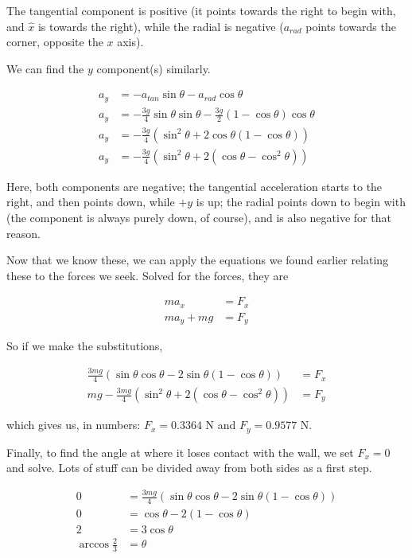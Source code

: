 \documentclass[8.01x]{subfiles}
\begin{document}
The tangential component is positive (it points towards the right to begin with, and $\hat{x}$ is towards the right), while the radial is negative ($a_{rad}$ points towards the corner, opposite the $x$ axis).

We can find the $y$ component(s) similarly.

\begin{align}
a_y &= -a_{tan} \sin \theta - a_{rad} \cos \theta\\
a_y &= -\frac{3 g}{4} \sin \theta \sin \theta - \frac{3 g}{2} (1 - \cos \theta) \cos \theta\\
a_y &= -\frac{3 g}{4} \left(\sin^2 \theta + 2\cos \theta (1 - \cos \theta)\right)\\
a_y &= -\frac{3 g}{4} \left(\sin^2 \theta + 2(\cos \theta - \cos^2 \theta)\right)
\end{align}

Here, both components are negative; the tangential acceleration starts to the right, and then points down, while $+y$ is up; the radial points down to begin with (the component is always purely down, of course), and is also negative for that reason.

Now that we know these, we can apply the equations we found earlier relating these to the forces we seek. Solved for the forces, they are 

\begin{align}
m a_x &= F_x\\
m a_y + m g &= F_y
\end{align}

So if we make the substitutions,

\begin{align}
\frac{3 m g}{4} \left(\sin \theta \cos \theta - 2 \sin \theta (1 - \cos \theta) \right) &= F_x\\
m g - \frac{3 m g}{4} \left(\sin^2 \theta + 2(\cos \theta - \cos^2 \theta)\right) &= F_y
\end{align}

which gives us, in numbers: $F_x = 0.3364$ N and $F_y = 0.9577$ N.

Finally, to find the angle at where it loses contact with the wall, we set $F_x = 0$ and solve. Lots of stuff can be divided away from both sides as a first step.

\begin{align}
0 &= \frac{3 m g}{4} \left(\sin \theta \cos \theta - 2 \sin \theta (1 - \cos \theta) \right)\\
0 &= \cos \theta - 2 (1 - \cos \theta)\\
2 &= 3\cos \theta\\
\arccos \frac{2}{3} &= \theta
\end{align}
\end{document}
